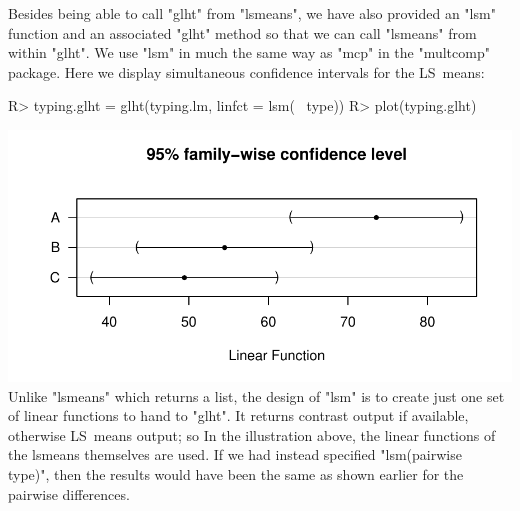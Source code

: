 \documentclass{article}
\begin{document}
Besides being able to call "glht" from "lsmeans", we have also provided an "lsm" function and an associated "glht" method so that we can call "lsmeans" from within "glht". We use "lsm" in much the same way as "mcp" in the "multcomp" package. Here we display simultaneous confidence intervals for the LS~means:
\begin{Winput}
R> typing.glht = glht(typing.lm, linfct = lsm(~ type))
R> plot(typing.glht)
\end{Winput}
\includegraphics[scale=.6]{using-lsmeans-typing-confint-plot-fig.pdf}
\\
Unlike "lsmeans" which returns a list, the design of "lsm" is to create just one set of linear functions to hand to "glht". It returns contrast output if available, otherwise LS~means output; so In the illustration above, the linear functions of the lsmeans themselves are used. If we had instead specified "lsm(pairwise ~ type)", then the results would have been the same as shown earlier for the pairwise differences. 
\end{document}
